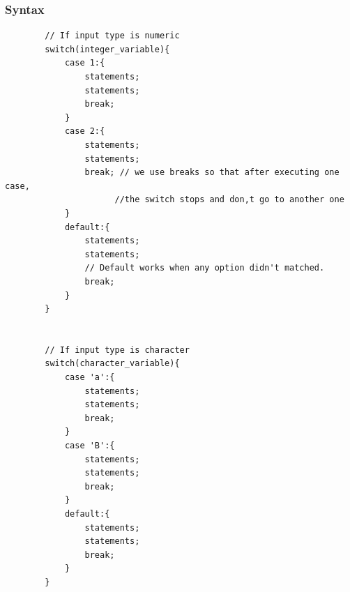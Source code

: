 \documentclass[openany]{book}  %
\begin{document}
\subsubsection{Syntax}
\begin{center}
    \begin{verbatim}
        // If input type is numeric
        switch(integer_variable){
            case 1:{
                statements;
                statements;
                break;
            }
            case 2:{
                statements;
                statements;
                break; // we use breaks so that after executing one case, 
                      //the switch stops and don,t go to another one
            }
            default:{
                statements;
                statements;
                // Default works when any option didn't matched.
                break;
            }
        }


        // If input type is character
        switch(character_variable){
            case 'a':{
                statements;
                statements;
                break;
            }
            case 'B':{
                statements;
                statements;
                break;
            }
            default:{
                statements;
                statements;
                break;
            }
        }
    \end{verbatim}
\end{center}
% 
%
\end{document}
